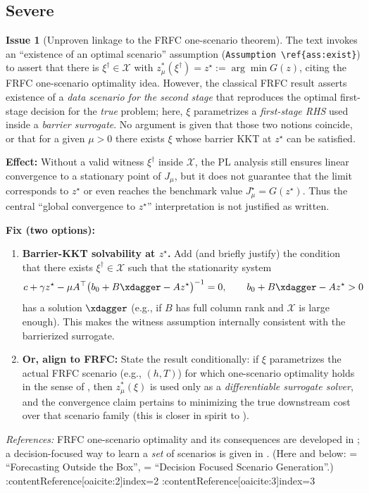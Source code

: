 \documentclass[11pt]{article}
\theoremstyle{definition}
\newtheorem{issue}{Issue}
\begin{document}
\subsection*{Severe}
\begin{issue}[Unproven linkage to the FRFC one-scenario theorem]
The text invokes an ``existence of an optimal scenario'' assumption (\texttt{Assumption~\textbackslash ref\{ass:exist\}}) to assert that there is $\xi^\dagger\in\mathcal X$ with $z^*_\mu(\xi^\dagger)=z^\star:=\arg\min G(z)$, citing the FRFC one-scenario optimality idea. However, the classical FRFC result asserts existence of a \emph{data scenario for the second stage} that reproduces the optimal first-stage decision for the \emph{true} problem; here, $\xi$ parametrizes a \emph{first-stage RHS} used inside a \emph{barrier surrogate}. No argument is given that those two notions coincide, or that for a given $\mu>0$ there exists $\xi$ whose barrier KKT at $z^\star$ can be satisfied.\par
\textbf{Effect:} Without a valid witness $\xi^\dagger$ inside $\mathcal X$, the PL analysis still ensures linear convergence to a stationary point of $J_\mu$, but it does not guarantee that the limit corresponds to $z^\star$ or even reaches the benchmark value $J_\mu^\star=G(z^\star)$. Thus the central ``global convergence to $z^\star$'' interpretation is not justified as written.\par
\textbf{Fix (two options):}
\begin{enumerate}[leftmargin=1.5em,itemsep=2pt]
\item \textbf{Barrier-KKT solvability at $z^\star$.} Add (and briefly justify) the condition that there exists $\xi^\dagger\in\mathcal X$ such that the stationarity system
\[
c+\gamma z^\star-\mu A^\top\big(b_0+B\xdagger-A z^\star\big)^{-1}=0,\qquad b_0+B\xdagger-Az^\star>0
\]
has a solution $\xdagger$ (e.g., if $B$ has full column rank and $\mathcal X$ is large enough). This makes the witness assumption internally consistent with the barrierized surrogate.
\item \textbf{Or, align to FRFC:} State the result conditionally: if $\xi$ parametrizes the actual FRFC scenario (e.g., $(h,T)$) for which one-scenario optimality holds in the sense of \cite{FOTB}, then $z^*_\mu(\xi)$ is used only as a \emph{differentiable surrogate solver}, and the convergence claim pertains to minimizing the true downstream cost over that scenario family (this is closer in spirit to \cite{DFS}).
\end{enumerate}
\emph{References:} FRFC one-scenario optimality and its consequences are developed in \cite{FOTB}; a decision-focused way to learn a \emph{set} of scenarios is given in \cite{DFS}. {\small(Here and below: \cite{FOTB} = ``Forecasting Outside the Box'', \cite{DFS} = ``Decision Focused Scenario Generation''.)} :contentReference[oaicite:2]{index=2} :contentReference[oaicite:3]{index=3}
\end{issue}
\end{document}
